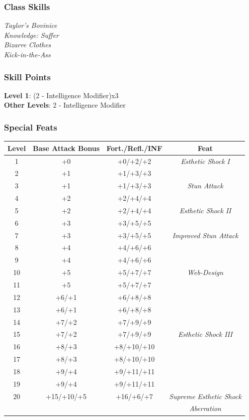 \documentclass[ letterpaper,12pt]{article}
\begin{document}
\subsubsection{Class Skills}
{\it
Taylor's Bovinice\\
Knowledge: Suffer\\
Bizarre Clothes\\
Kick-in-the-Ass\\}

\subsubsection{Skill Points}
{\bf Level 1}: (2 - Intelligence Modifier)x3\\
{\bf Other Levels}: 2 - Intelligence Modifier\\

\subsubsection{Special Feats}

\begin{center} \begin{tabular}{|c||c|c|c|}
\hline
{\bf Level}&{\bf Base Attack Bonus}&{\bf Fort./Refl./INF}&{\bf Feat}\\
\hline
1&+0&+0/+2/+2&{\it Esthetic Shock I}\\
\hline
2&+1&+1/+3/+3&\\
\hline
3&+1&+1/+3/+3&{\it Stun Attack}\\
\hline
4&+2&+2/+4/+4&\\
\hline
5&+2&+2/+4/+4&{\it Esthetic Shock II}\\
\hline
6&+3&+3/+5/+5&\\
\hline
7&+3&+3/+5/+5&{\it Improved Stun Attack}\\
\hline
8&+4&+4/+6/+6&\\
\hline
9&+4&+4/+6/+6&\\
\hline
10&+5&+5/+7/+7&{\it Web-Design}\\
\hline
11&+5&+5/+7/+7&\\
\hline
12&+6/+1&+6/+8/+8&\\
\hline
13&+6/+1&+6/+8/+8&\\
\hline
14&+7/+2&+7/+9/+9&\\
\hline
15&+7/+2&+7/+9/+9&{\it Esthetic Shock III }\\
\hline
16&+8/+3&+8/+10/+10&\\
\hline
17&+8/+3&+8/+10/+10&\\
\hline
18&+9/+4&+9/+11/+11&\\
\hline
19&+9/+4&+9/+11/+11&\\
\hline
20&+15/+10/+5&+16/+6/+7&{\it Supreme Esthetic Shock}\\
&&&{\it Aberration}\\
\hline
\end{tabular} \end{center}
\end{document}

